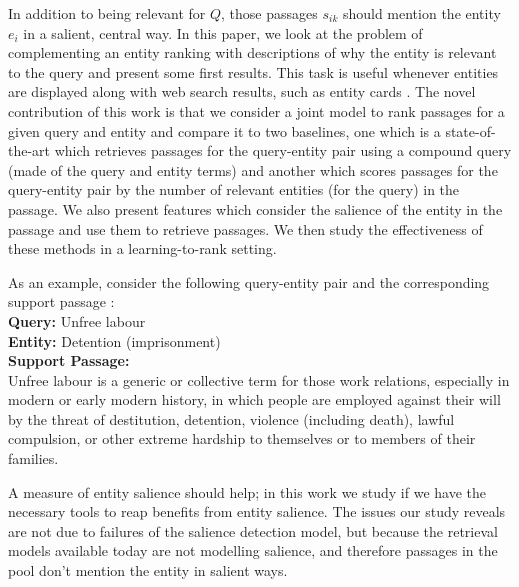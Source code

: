 \documentclass[sigconf,anonymous,review]{acmart}
\begin{document}
In addition to being relevant for $Q$, those passages $s_{ik}$ should mention the entity $e_i$ in a salient, central way.  In this paper, we look at the problem of complementing an entity ranking with descriptions of why the entity is relevant to the query and present some first results. This task is useful whenever entities are displayed along with web search results, such as entity cards \cite{berntson2012providing}. The novel contribution of this work is that we consider a joint model to rank passages for a given query and entity and compare it to two baselines, one which is a state-of-the-art which retrieves passages for the query-entity pair using a compound query (made of the query and entity terms) and another which scores passages for the query-entity pair by the number of relevant entities (for the query) in the passage. We also present features which consider the salience of the entity in the passage and use them to retrieve passages. We then study the effectiveness of these methods in a learning-to-rank \cite{liu2009learning} setting.

As an example, consider the following query-entity pair and the corresponding support passage : \\
\textbf{Query: } Unfree labour \\
\textbf{Entity: } Detention (imprisonment) \\
\textbf{Support Passage: } \\
Unfree labour is a generic or collective term for those work relations, especially in modern or early modern history, in which people are employed against their will by the threat of destitution, detention, violence (including death), lawful compulsion, or other extreme hardship to themselves or to members of their families.

A measure of entity salience should help; in this work we study if we have the necessary tools to reap benefits from entity salience. The issues our study reveals are not due to failures of the salience detection model, but because the retrieval models available today are not modelling salience, and therefore passages in the pool don't mention the entity in salient ways. 
\end{document}
